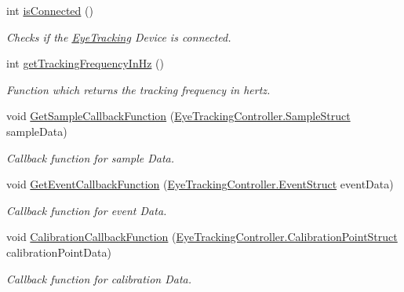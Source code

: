 \begin{DoxyCompactItemize}
int \hyperlink{class_web_analyzer_1_1_eye_tracking_1_1_eye_tracking_model_a29a7377e721b88fbd80553699e1d7228}{is\+Connected} ()
\begin{DoxyCompactList}\small\item\em Checks if the \hyperlink{namespace_web_analyzer_1_1_eye_tracking}{Eye\+Tracking} Device is connected. \end{DoxyCompactList}\item 
int \hyperlink{class_web_analyzer_1_1_eye_tracking_1_1_eye_tracking_model_a699dac245ea96b5b2426e395d9bb93fd}{get\+Tracking\+Frequency\+In\+Hz} ()
\begin{DoxyCompactList}\small\item\em Function which returns the tracking frequency in hertz. \end{DoxyCompactList}\item 
void \hyperlink{class_web_analyzer_1_1_eye_tracking_1_1_eye_tracking_model_a88d3a53476fe1dc652fbbb7ce8b30fdd}{Get\+Sample\+Callback\+Function} (\hyperlink{struct_web_analyzer_1_1_eye_tracking_1_1_eye_tracking_controller_1_1_sample_struct}{Eye\+Tracking\+Controller.\+Sample\+Struct} sample\+Data)
\begin{DoxyCompactList}\small\item\em Callback function for sample Data. \end{DoxyCompactList}\item 
void \hyperlink{class_web_analyzer_1_1_eye_tracking_1_1_eye_tracking_model_a01a7efee3ea0a2a06c1c7405d8fb9598}{Get\+Event\+Callback\+Function} (\hyperlink{struct_web_analyzer_1_1_eye_tracking_1_1_eye_tracking_controller_1_1_event_struct}{Eye\+Tracking\+Controller.\+Event\+Struct} event\+Data)
\begin{DoxyCompactList}\small\item\em Callback function for event Data. \end{DoxyCompactList}\item 
void \hyperlink{class_web_analyzer_1_1_eye_tracking_1_1_eye_tracking_model_a64c9fd68eba26c6731242d9bf3c07a53}{Calibration\+Callback\+Function} (\hyperlink{struct_web_analyzer_1_1_eye_tracking_1_1_eye_tracking_controller_1_1_calibration_point_struct}{Eye\+Tracking\+Controller.\+Calibration\+Point\+Struct} calibration\+Point\+Data)
\begin{DoxyCompactList}\small\item\em Callback function for calibration Data. \end{DoxyCompactList}\end{DoxyCompactItemize}
